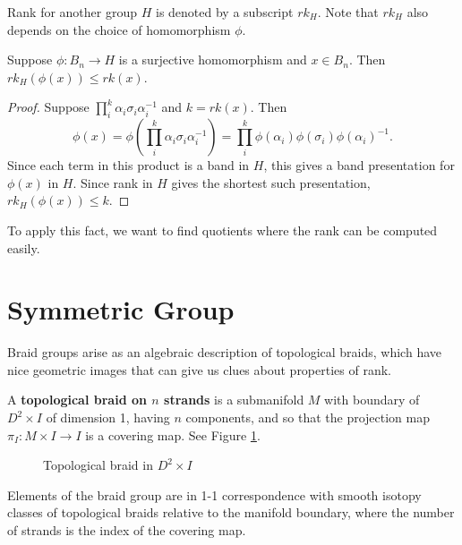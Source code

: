 \documentclass[12pt]{thesis}
\begin{document}
Rank for another group $H$ is denoted by a subscript $rk_{H}$.
Note that $rk_{H}$ also depends on the choice of homomorphism $\phi$.

\begin{proposition}
    \label{prop:lower-bounds-from-quotient}
Suppose $\phi \colon B_{n} \rightarrow H$ is a surjective homomorphism and $x \in B_{n}$. Then $rk_{H}(\phi(x)) \leq rk(x)$.
\end{proposition}

\begin{proof}
Suppose $\prod_{i}^{k} \alpha_{i}\sigma_{i}\alpha_{i}^{-1}$
and $k = rk(x)$.
Then 
\[
    \phi(x)
    = \phi(\prod_{i}^{k} \alpha_{i}\sigma_{i}\alpha_{i}^{-1})
    = \prod_{i}^{k} \phi(\alpha_{i})\phi(\sigma_{i})\phi(\alpha_{i})^{-1}.
\]
Since each term in this product is a band in $H$, this gives a
band presentation for $\phi(x)$ in $H$.
Since rank in $H$ gives the shortest such presentation, $rk_{H}(\phi(x)) \leq k$.
\end{proof}

To apply this fact, we want to find quotients
where the rank can be computed easily.

\section{Symmetric Group}

\label{chap:symmetric-group}

Braid groups arise as an algebraic description of topological braids,
which have nice geometric images that can give us clues about properties of rank.
\begin{definition}
    A \textbf{topological braid on $n$ strands} is a submanifold $M$ with boundary of $D^{2} \times I$ of dimension 1, having $n$ components,
    and so that the projection map $\pi_{I} \colon M \times I \rightarrow I$
    is a covering map. See Figure \ref{fig:topological-braid}.
\end{definition}

\begin{figure}[h]
    \centering
    \def\svgwidth{10cm}
    
    \caption{Topological braid in $D^{2} \times I$}
    \label{fig:topological-braid}
\end{figure}

Elements of the braid group are in 1-1 correspondence with smooth isotopy classes of topological braids
relative to the manifold boundary,
where the number of strands is the index of the covering map.
\end{document}

